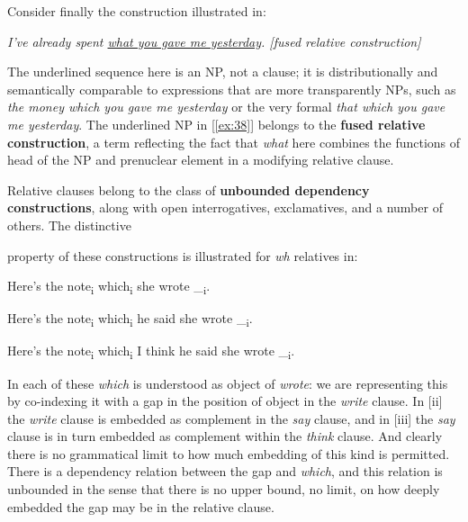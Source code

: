 Consider finally the construction illustrated in:
\begin{examples}
    \item \label{ex:38} \itshape I've already spent \uline{what you gave me yesterday}. \hfill \textnormal{[fused relative construction]}
\end{examples}

The underlined sequence here is an NP, not a clause; it is distributionally and semantically comparable to expressions that are more transparently NPs, such as \textit{the money which you gave me yesterday} or the very formal \textit{that which you gave me yesterday}. The underlined NP in [\ref{ex:38}] belongs to the \textbf{fused relative construction}, a term reflecting the fact that \textit{what} here combines the functions of head of the NP and prenuclear element in a modifying relative clause.

Relative clauses belong to the class of \textbf{unbounded dependency constructions}, along with open interrogatives, exclamatives, and a number of others. The distinctive 

\newpage

\noindent property of these constructions is illustrated for \textit{wh} relatives in:
\begin{examples}
\item \label{ex:39}
    \begin{examples}
        \item Here's the note\textsubscript{i} \ob which\textsubscript{i} she wrote \_\textsubscript{i}\cb.
        \item Here's the note\textsubscript{i} \ob which\textsubscript{i} he said she wrote \_\textsubscript{i}\cb.
        \item Here's the note\textsubscript{i} \ob which\textsubscript{i} I think he said she wrote \_\textsubscript{i}\cb.
    \end{examples}
\end{examples}
In each of these \textit{which} is understood as object of \textit{wrote}: we are representing this by co-indexing it with a gap in the position of object in the \textit{write} clause. In [ii] the \textit{write} clause is embedded as complement in the \textit{say} clause, and in [iii] the \textit{say} clause is in turn embedded as complement within the \textit{think} clause. And clearly there is no grammatical limit to how much embedding of this kind is permitted. There is a dependency relation between the gap and \textit{which}, and this relation is {unbounded} in the sense that there is no upper bound, no limit, on how deeply embedded the gap may be in the relative clause.



